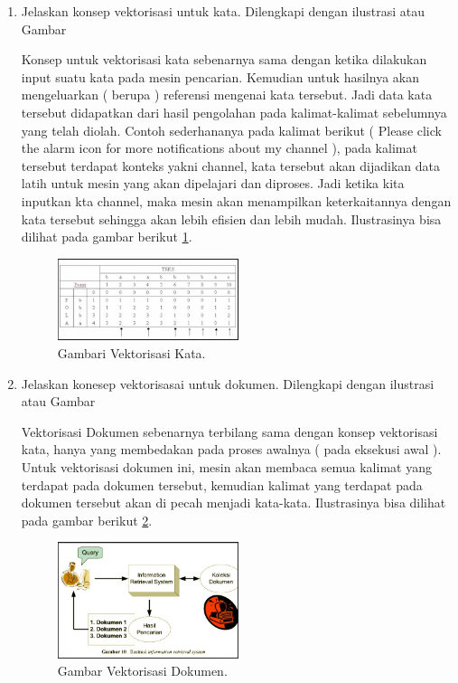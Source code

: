 \begin{enumerate}
\item Jelaskan konsep vektorisasi untuk kata. Dilengkapi dengan ilustrasi atau Gambar
\par Konsep untuk vektorisasi kata sebenarnya sama dengan ketika dilakukan input suatu kata pada mesin pencarian. Kemudian untuk hasilnya akan mengeluarkan ( berupa ) referensi mengenai kata tersebut. Jadi data kata tersebut didapatkan dari hasil pengolahan pada kalimat-kalimat sebelumnya yang telah diolah. Contoh sederhananya pada kalimat berikut ( Please click the alarm icon for more notifications about my channel ), pada kalimat tersebut terdapat konteks yakni channel, kata tersebut akan dijadikan data latih untuk mesin yang akan dipelajari dan diproses. Jadi ketika kita inputkan kta channel, maka mesin akan menampilkan keterkaitannya dengan kata tersebut sehingga akan lebih efisien dan lebih mudah.  Ilustrasinya bisa dilihat pada gambar berikut  \ref{no3}.
\begin{figure}[ht]
\centerline{\includegraphics[width=0.5\textwidth]{figures/AFS/no3.png}}
\caption{Gambari Vektorisasi Kata.}
\label{no3}
\end{figure}

\item Jelaskan konesep vektorisasai untuk dokumen. Dilengkapi dengan ilustrasi atau Gambar
\par Vektorisasi Dokumen sebenarnya terbilang sama dengan konsep vektorisasi kata, hanya yang membedakan pada proses awalnya ( pada eksekusi awal ). Untuk vektorisasi dokumen ini, mesin akan membaca semua kalimat yang terdapat pada dokumen tersebut, kemudian kalimat yang terdapat pada dokumen tersebut akan di pecah menjadi kata-kata. Ilustrasinya bisa dilihat pada gambar berikut  \ref{no4}.
\begin{figure}[ht]
\centerline{\includegraphics[width=0.5\textwidth]{figures/AFS/no4.png}}
\caption{Gambar Vektorisasi Dokumen.}
\label{no4}
\end{figure}


\end{enumerate}
